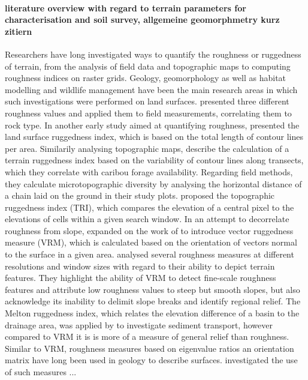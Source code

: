 \documentclass[preprint,12pt,authoryear]{elsarticle}
\begin{document}
\paragraph{literature overview with regard to terrain parameters for characterisation and soil survey, allgemeine geomorphmetry kurz zitiern}
Researchers have long investigated ways to quantify the roughness or ruggedness of terrain, from the analysis of field data and topographic maps to computing roughness indices on raster grids. Geology, geomorphology as well as habitat modelling and wildlife management have been the main research areas in which such investigations were performed on land surfaces.  \cite{Hobson1972} presented three different roughness values and applied them to field measurements, correlating them to rock type. In another early study aimed at quantifying roughness, \cite{Beasom1983} presented the land surface ruggedness index, which is based on the total length of contour lines per area. Similarily analysing topographic maps, \cite{Nellemann1994} describe the calculation of a terrain ruggedness index based on the variability of contour lines along transects, which they correlate with caribou forage availability. Regarding field methods, they calculate microtopographic diversity by analysing the horizontal distance of a chain laid on the ground in their study plots. \cite{Riley1999} proposed the topographic ruggedness index (TRI), which compares the elevation of a central pixel to the elevations of cells within a given search window. In an attempt to decorrelate roughness from slope, \cite{Sappington2007} expanded on the work of \cite{Hobson1972} to introduce vector ruggedness measure (VRM), which is calculated based on the orientation of vectors normal to the surface in a given area. \citep{Grohmann2010} analysed several roughness measures at different resolutions and window sizes with regard to their ability to depict terrain features. They highlight the ability of VRM to detect fine-scale roughness features and attribute low roughness values to steep but smooth slopes, but also acknowledge its inability to delimit slope breaks and identify regional relief. The Melton ruggedness index, which relates  the elevation difference of a basin to the drainage area, was applied by \cite{Marchi2005} to investigate sediment transport, however compared to VRM  it is is more of a measure of general relief than roughness. Similar to VRM, roughness measures based on eigenvalue ratios an orientation matrix have long been used in geology to describe surfaces. \cite{Coblentz2014} investigated the use of such measures ...
\end{document}
